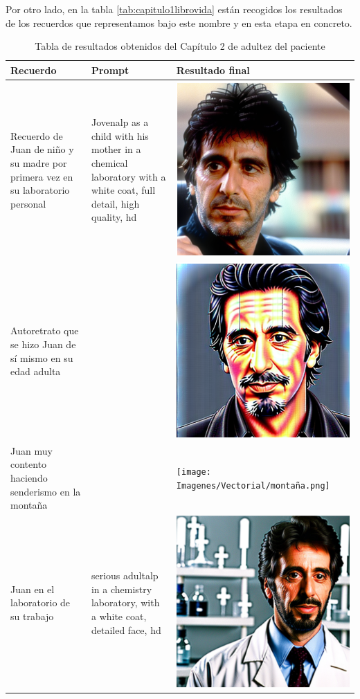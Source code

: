 Por otro lado, en la tabla \ref*{tab:capitulo1librovida} están recogidos los resultados de los recuerdos que representamos bajo este nombre y en esta etapa en concreto. \\

 \begin{table}
	\centering
	\begin{tabular}{>{\centering\arraybackslash}m{5cm} >{\arraybackslash}m{5cm}>{\arraybackslash}m{5cm}}
		\textbf{Recuerdo} & \textbf{Prompt} & \textbf{Resultado final} \\
		\hline
		Recuerdo de Juan de niño y su madre por primera vez en su laboratorio personal & Jovenalp as a child with his mother in a chemical laboratory with a white coat, full detail, high quality, hd & \includegraphics[width = 0.3
		\textwidth]{Imagenes/Vectorial/padultalp.png}\\
		\hline
		Autoretrato que se hizo Juan de sí mismo en su edad adulta &  & \includegraphics[width = 0.3
		\textwidth]{Imagenes/Vectorial/autorretrato2.png}\\
		\hline
		Juan muy contento haciendo senderismo en la montaña &  & \texttt{[image: Imagenes/Vectorial/montaña.png]}\\
		\hline
		Juan en el laboratorio de su trabajo & serious adultalp in a chemistry laboratory, with a white coat, detailed face, hd & \includegraphics[width = 0.3
		\textwidth]{Imagenes/Vectorial/alplab.png}\\
		\hline
	\end{tabular}
	\caption{Tabla de resultados obtenidos del Capítulo 2 de adultez del paciente}
	\label{tab:capitulo2librovida}
\end{table}
 
